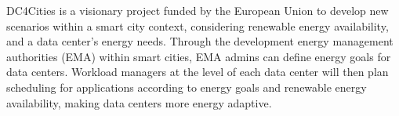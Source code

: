 DC4Cities \cite{DC4Cities} is a visionary project funded by the European Union to develop new scenarios within a smart city context, considering renewable energy availability, and a data center's energy needs. Through the development energy management authorities (EMA) within smart cities, EMA admins can define energy goals for data centers. Workload managers at the level of each data center will then plan scheduling for applications according to energy goals and renewable
energy availability, making data centers more energy adaptive.